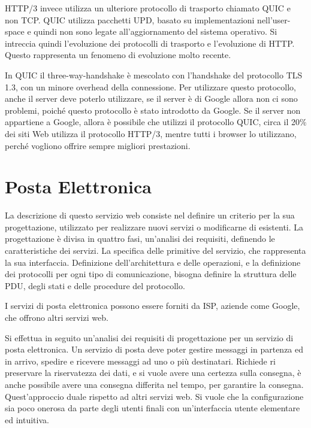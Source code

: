 \documentclass{article}
\numberwithin{equation}{subsection}
\begin{document}

HTTP/3 invece utilizza un ulteriore protocollo di trasporto chiamato QUIC e non TCP. QUIC utilizza pacchetti UPD, basato su implementazioni nell'user-space e quindi 
non sono legate all'aggiornamento del sistema operativo. 
Si intreccia quindi l'evoluzione dei protocolli di trasporto e l'evoluzione di HTTP. 
Questo rappresenta un fenomeno di evoluzione molto recente. 

In QUIC il three-way-handshake è mescolato con l'handshake del protocollo TLS 1.3, con un minore overhead della connessione. Per utilizzare questo protocollo, 
anche il server deve poterlo utilizzare, se il server è di Google allora non ci sono problemi, poiché questo protocollo è stato introdotto da Google. Se il 
server non appartiene a Google, allora è possibile che utilizzi il protocollo QUIC, circa il 20\% dei siti Web utilizza il protocollo HTTP/3, mentre tutti i 
browser lo utilizzano, perché vogliono offrire sempre migliori prestazioni. 

\clearpage

\section{Posta Elettronica}

La descrizione di questo servizio web consiste nel definire un criterio per la sua progettazione, utilizzato per realizzare nuovi servizi o modificarne di esistenti. 
La progettazione è divisa in quattro fasi, un'analisi dei requisiti, definendo le caratteristiche dei servizi. La specifica delle primitive del servizio, che rappresenta la sua interfaccia. 
Definizione dell'architettura e delle operazioni, e la definizione dei protocolli per ogni tipo di comunicazione, bisogna definire la struttura delle PDU, degli stati e delle procedure del protocollo. 

I servizi di posta elettronica possono essere forniti da ISP, aziende come Google, che offrono altri servizi web. 


Si effettua in seguito un'analisi dei requisiti di progettazione per un servizio di posta elettronica. 
Un servizio di posta deve poter gestire messaggi in partenza ed in arrivo, spedire e ricevere messaggi ad uno o più 
destinatari. Richiede ri preservare la riservatezza dei dati, e si vuole avere una certezza sulla consegna, è anche possibile avere una consegna 
differita nel tempo, per garantire la consegna. Quest'approccio duale rispetto ad altri servizi web. 
Si vuole che la configurazione sia poco onerosa da parte degli utenti finali con un'interfaccia utente 
elementare ed intuitiva. 
\end{document}
